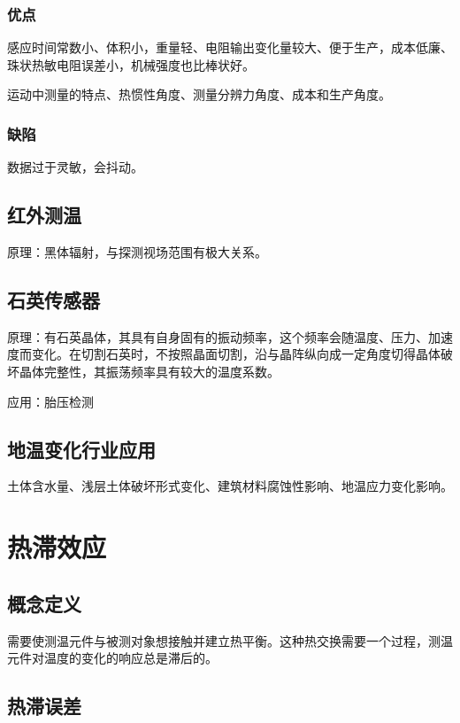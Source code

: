 \documentclass[UTF8,11pt]{ctexbook}
\begin{document}
\subsubsection{优点}

感应时间常数小、体积小，重量轻、电阻输出变化量较大、便于生产，成本低廉、珠状热敏电阻误差小，机械强度也比棒状好。

运动中测量的特点、热惯性角度、测量分辨力角度、成本和生产角度。

\subsubsection{缺陷}

数据过于灵敏，会抖动。

\subsection{红外测温}

原理：黑体辐射，与探测视场范围有极大关系。

\subsection{石英传感器}

原理：有石英晶体，其具有自身固有的振动频率，这个频率会随温度、压力、加速度而变化。在切割石英时，不按照晶面切割，沿与晶阵纵向成一定角度切得晶体破坏晶体完整性，其振荡频率具有较大的温度系数。

应用：胎压检测

\subsection{地温变化行业应用}

土体含水量、浅层土体破坏形式变化、建筑材料腐蚀性影响、地温应力变化影响。

\section{热滞效应}

\subsection{概念定义}

需要使测温元件与被测对象想接触并建立热平衡。这种热交换需要一个过程，测温元件对温度的变化的响应总是滞后的。

\subsection{热滞误差}
\end{document}

